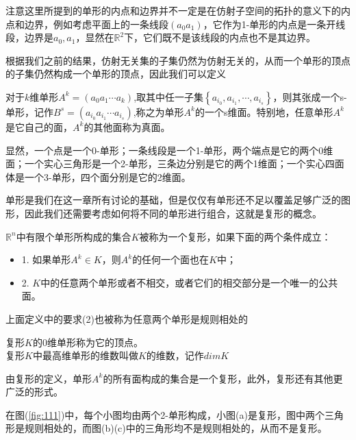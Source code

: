 \begin{remark}
注意这里所提到的单形的内点和边界并不一定是在仿射子空间的拓扑的意义下的内点和边界，例如考虑平面上的一条线段$(a_{0}a_{1})$，它作为1-单形的内点是一条开线段，边界是$a_{0},a_{1}$，显然在$\mathbb{R}^{2}$下，它们既不是该线段的内点也不是其边界。
\end{remark}
根据我们之前的结果，仿射无关集的子集仍然为仿射无关的，从而一个单形的顶点的子集仍然构成一个单形的顶点，因此我们可以定义
\begin{definition}
对于$k$维单形$A^{k}=(a_{0}a_{1}\cdots a_{k})$,取其中任一子集$\left\{a_{i_{0}},a_{i_{1}},\cdots,a_{i_{s}}\right\}$，则其张成一个s-单形，记作$B^{s}=(a_{i_{0}}a_{i_{1}}\cdots a_{i_{s}})$,称之为单形$A^{k}$的一个s维面。特别地，任意单形$A^{k}$是它自己的面，$A^{k}$的其他面称为真面。
\end{definition}
\begin{example}
显然，一个点是一个0-单形；一条线段是一个1-单形，两个端点是它的两个0维面；一个实心三角形是一个2-单形，三条边分别是它的两个1维面；一个实心四面体是一个3-单形，四个面分别是它的2维面。
\end{example}
单形是我们在这一章所有讨论的基础，但是仅仅有单形还不足以覆盖足够广泛的图形，因此我们还需要考虑如何将不同的单形进行组合，这就是复形的概念。
\begin{definition}
$\mathbb{R}^{n}$中有限个单形所构成的集合$K$被称为一个复形，如果下面的两个条件成立：
\begin{itemize}
    \item 1. 如果单形$A^{k}\in K$，则$A^{k}$的任何一个面也在$K$中；
    \item 2. $K$中的任意两个单形或者不相交，或者它们的相交部分是一个唯一的公共面。
\end{itemize}
\end{definition}
\begin{remark}
    上面定义中的要求(2)也被称为任意两个单形是规则相处的
\end{remark}
\begin{definition}
复形$K$的0维单形称为它的顶点。\\
复形$K$中最高维单形的维数叫做$K$的维数，记作$dimK$
\end{definition}

由复形的定义，单形$A^{k}$的所有面构成的集合是一个复形，此外，复形还有其他更广泛的形式。
\begin{example}
在图(\ref{fig:111})中，每个小图均由两个2-单形构成，小图(a)是复形，图中两个三角形是规则相处的，而图(b)(c)中的三角形均不是规则相处的，从而不是复形。
\end{example}

